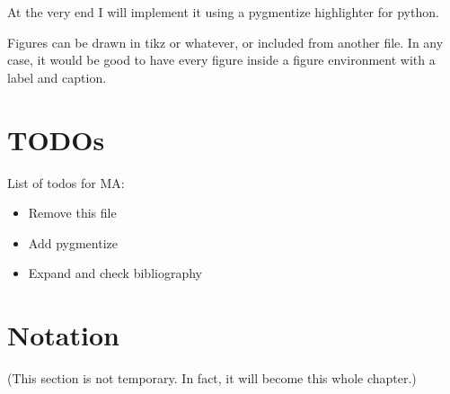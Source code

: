 At the very end I will implement it using a pygmentize highlighter for python.

Figures can be drawn in tikz or whatever, or included from another file. In any case, it would be good to have every figure inside a figure environment with a label and caption.

\section{TODOs}
List of todos for MA:
\begin{itemize}
\item Remove this file
\item Add pygmentize
\item Expand and check bibliography
\end{itemize}


\section{Notation}
(This section is not temporary. In fact, it will become this whole chapter.)


